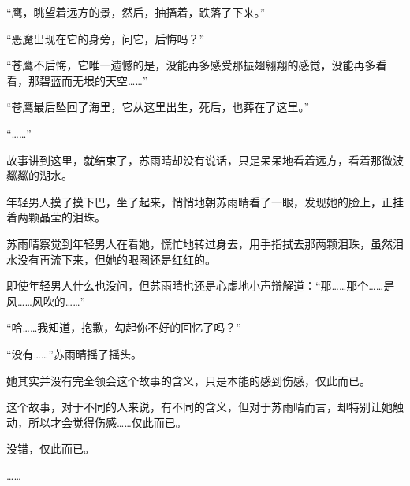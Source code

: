 “鹰，眺望着远方的景，然后，抽搐着，跌落了下来。”

“恶魔出现在它的身旁，问它，后悔吗？”

“苍鹰不后悔，它唯一遗憾的是，没能再多感受那振翅翱翔的感觉，没能再多看看，那碧蓝而无垠的天空……”

“苍鹰最后坠回了海里，它从这里出生，死后，也葬在了这里。”

“……”

故事讲到这里，就结束了，苏雨晴却没有说话，只是呆呆地看着远方，看着那微波粼粼的湖水。

年轻男人摸了摸下巴，坐了起来，悄悄地朝苏雨晴看了一眼，发现她的脸上，正挂着两颗晶莹的泪珠。

苏雨晴察觉到年轻男人在看她，慌忙地转过身去，用手指拭去那两颗泪珠，虽然泪水没有再流下来，但她的眼圈还是红红的。

即使年轻男人什么也没问，但苏雨晴也还是心虚地小声辩解道：“那……那个……是风……风吹的……”

“哈……我知道，抱歉，勾起你不好的回忆了吗？”

“没有……”苏雨晴摇了摇头。

她其实并没有完全领会这个故事的含义，只是本能的感到伤感，仅此而已。

这个故事，对于不同的人来说，有不同的含义，但对于苏雨晴而言，却特别让她触动，所以才会觉得伤感……仅此而已。

没错，仅此而已。

……
